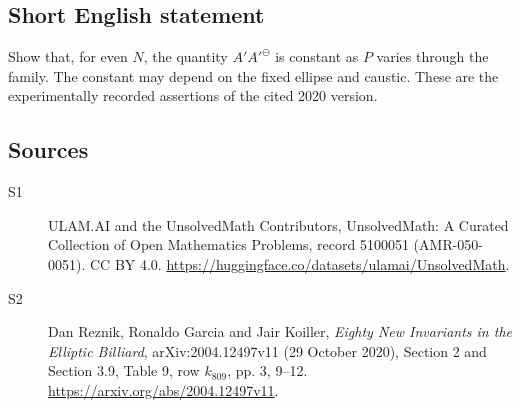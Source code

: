 \documentclass[11pt]{article}
\begin{document}
\subsection{Short English statement}
Show that, for even $N$, the quantity $A'{A'}^\ominus$ is constant as $P$ varies through the family. The constant may depend on the fixed ellipse and caustic. These are the experimentally recorded assertions of the cited 2020 version.
\subsection{Sources}
\begin{description}
\item[\hypertarget{source:5100051:1}{S1}] ULAM.AI and the UnsolvedMath Contributors, UnsolvedMath: A Curated Collection of Open Mathematics Problems, record 5100051 (AMR-050-0051). CC BY 4.0. \url{https://huggingface.co/datasets/ulamai/UnsolvedMath}.
\item[\hypertarget{source:5100051:2}{S2}] Dan Reznik, Ronaldo Garcia and Jair Koiller, \emph{Eighty New Invariants in the Elliptic Billiard}, arXiv:2004.12497v11 (29 October 2020), Section 2 and Section 3.9, Table 9, row $k_{809}$, pp. 3, 9--12. \url{https://arxiv.org/abs/2004.12497v11}.
\end{description}
\label{end:5100051}
\end{document}
